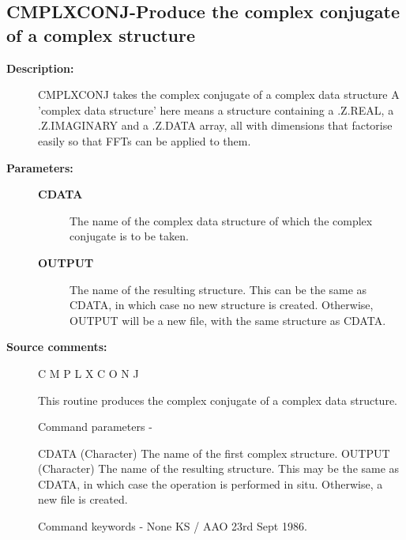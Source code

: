 \subsection{CMPLXCONJ-\label{CMPLXCONJ}Produce the complex conjugate of a complex structure}
\begin{description}

\item [\textbf{Description:}]
 CMPLXCONJ takes the complex conjugate of a complex data structure
 A 'complex data structure' here means a structure containing a
 .Z.REAL, a .Z.IMAGINARY and a .Z.DATA array, all with dimensions
 that factorise easily so that FFTs can be applied to them.

\item [\textbf{Parameters:}]
\begin{description}
\item [\textbf{CDATA}]
 The name of the complex data structure of which
 the complex conjugate is to be taken.
\item [\textbf{OUTPUT}]
 The name of the resulting structure. This can
 be the same as CDATA, in which case no new structure is
 created.  Otherwise, OUTPUT will be a new file, with the
 same structure as CDATA.
\end{description}

\item [\textbf{Source comments:}]
\begin{terminalv}
 C M P L X C O N J

 This routine produces the complex conjugate of a complex data
 structure.

 Command parameters -

 CDATA    (Character) The name of the first complex structure.
 OUTPUT   (Character) The name of the resulting structure.  This
          may be the same as CDATA, in which case the operation
          is performed in situ.  Otherwise, a new file is created.

 Command keywords - None
                                     KS / AAO  23rd Sept 1986.
\end{terminalv}
\end{description}
